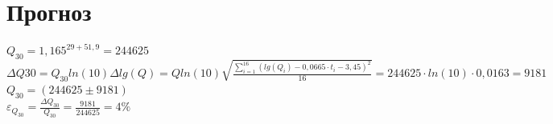 \documentclass[12pt]{article}
\begin{document}
	\section{Прогноз}
	$Q_{30} = 1,165^{29+51,9}=244625$\\
	$\Delta Q{30} = Q_{30} ln(10)\Delta lg(Q) = Q ln(10) \sqrt{\frac{\sum\limits_{i=1}^{16}(lg(Q_i)-0,0665\cdot t_i - 3,45)^2}{16}}=244625\cdot ln(10)\cdot 0,0163=9181$\\
	$Q_{30} = (244625\pm 9181)$\\
	$\varepsilon_{Q_{30}} = \frac{\Delta Q_{30}}{Q_{30}}=\frac{9181}{244625} = 4\%$
\end{document}
